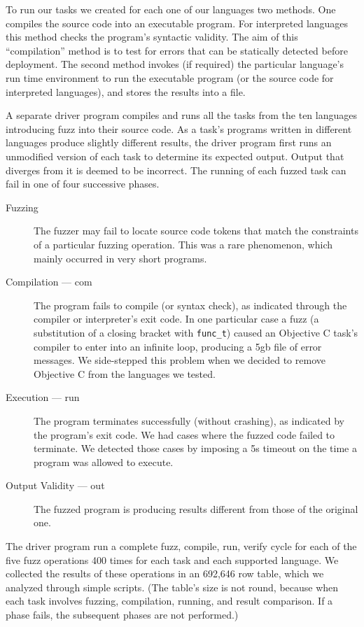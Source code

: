 \documentclass[10pt]{sigplanconf}
\begin{document}
To run our tasks we created for each one of our languages two methods.
One compiles the source code into an executable program.
For interpreted languages this method checks the program's syntactic validity.
The aim of this ``compilation'' method is to test for errors that can
be statically detected before deployment.
The second method invokes (if required) the particular language's
run time environment to run the executable program
(or the source code for interpreted languages),
and stores the results into a file.

A separate driver program compiles and runs all the tasks from the ten
languages introducing fuzz into their source code.
As a task's programs written in different languages produce slightly
different results,
the driver program first runs an unmodified version of each task
to determine its expected output.
Output that diverges from it is deemed to be incorrect.
The running of each fuzzed task can fail in one of four successive
phases.
\begin{description}
\item[Fuzzing]
The fuzzer may fail to locate source code tokens that match the
constraints of a particular fuzzing operation.
This was a rare phenomenon, which mainly occurred in very short programs.
\item[Compilation --- com]
The program fails to compile (or syntax check),
as indicated through the compiler or interpreter's exit code.
In one particular case a fuzz
(a substitution of a closing bracket with {\tt func\_t})
caused an Objective C task's compiler
to enter into an infinite loop,
producing a 5{\sc gb} file of error messages.
We side-stepped this problem when we decided to remove Objective C from
the languages we tested.
\item[Execution --- run]
The program terminates successfully (without crashing),
as indicated by the program's exit code.
We had cases where the fuzzed code failed to terminate.
We detected those cases by imposing a 5s timeout on the time a program
was allowed to execute.
\item[Output Validity --- out]
The fuzzed program is producing results different from those of
the original one.
\end{description}

The driver program run a complete fuzz, compile, run, verify cycle
for each of the five fuzz operations 400 times for
each task and each supported language.
We collected the results of these operations in an 692,646 row table,
which we analyzed through simple scripts.
(The table's size is not round, because when each task involves
fuzzing, compilation, running, and result comparison.
If a phase fails, the subsequent phases are not performed.)
\end{document}
